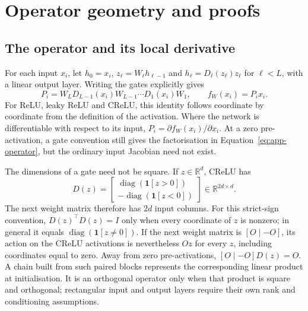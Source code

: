 \documentclass{article}
\theoremstyle{definition}
\theoremstyle{remark}
\begin{document}


\clearpage
\appendix
\raggedbottom

\section{Operator geometry and proofs}
\label{app:theory}

\subsection{The operator and its local derivative}

For each input $x_i$, let $h_0=x_i$, $z_\ell=W_\ell h_{\ell-1}$ and
$h_\ell=D_\ell(z_\ell)z_\ell$ for $\ell<L$, with a linear output layer.
Writing the gates explicitly gives
\begin{equation}
 P_i=W_LD_{L-1}(x_i)W_{L-1}\cdots D_1(x_i)W_1,
 \qquad f_W(x_i)=P_i x_i.
 \label{eq:app-operator}
\end{equation}
For ReLU, leaky ReLU and CReLU, this identity follows coordinate by coordinate from the definition of the activation. Where the network is differentiable with respect to its input, $P_i=\partial f_W(x_i)/\partial x_i$. At a zero pre-activation, a gate convention still gives the factorisation in Equation~\eqref{eq:app-operator}, but the ordinary input Jacobian need not exist.

The dimensions of a gate need not be square. If $z\in\mathbb R^d$, CReLU has
\begin{equation}
 D(z)=\begin{bmatrix}
 \operatorname{diag}(\mathbf 1[z>0])\\
 -\operatorname{diag}(\mathbf 1[z<0])
 \end{bmatrix}\in\mathbb R^{2d\times d}.
\end{equation}
The next weight matrix therefore has $2d$ input columns. For this strict-sign convention, $D(z)^\top D(z)=I$ only when every coordinate of $z$ is nonzero; in general it equals $\operatorname{diag}(\mathbf 1[z\ne0])$. If the next weight matrix is $[O\mid-O]$, its action on the CReLU activations is nevertheless $Oz$ for every $z$, including coordinates equal to zero. Away from zero pre-activations, $[O\mid-O]D(z)=O$. A chain built from such paired blocks represents the corresponding linear product at initialisation. It is an orthogonal operator only when that product is square and orthogonal; rectangular input and output layers require their own rank and conditioning assumptions.
\end{document}
